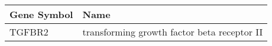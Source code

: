 \begin{tabular}{ll}
\toprule
Gene Symbol &                                        Name \\
\midrule
     TGFBR2 & transforming growth factor beta receptor II \\
\bottomrule
\end{tabular}
